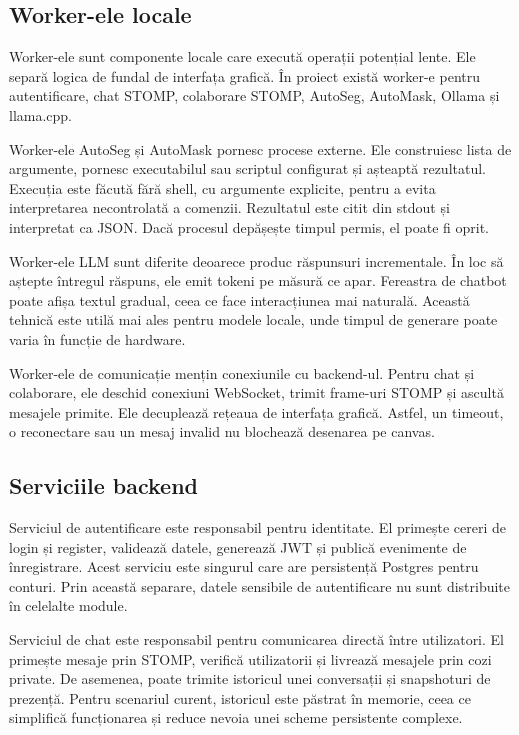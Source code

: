 \subsection{Worker-ele locale}
\label{subsec:worker-e-locale}

Worker-ele sunt componente locale care execută operații potențial lente.
Ele separă logica de fundal de interfața grafică.
În proiect există worker-e pentru autentificare, chat STOMP, colaborare STOMP, AutoSeg, AutoMask, Ollama și llama.cpp.

Worker-ele AutoSeg și AutoMask pornesc procese externe.
Ele construiesc lista de argumente, pornesc executabilul sau scriptul configurat și așteaptă rezultatul.
Execuția este făcută fără shell, cu argumente explicite, pentru a evita interpretarea necontrolată a comenzii.
Rezultatul este citit din stdout și interpretat ca JSON.
Dacă procesul depășește timpul permis, el poate fi oprit.

Worker-ele LLM sunt diferite deoarece produc răspunsuri incrementale.
În loc să aștepte întregul răspuns, ele emit tokeni pe măsură ce apar.
Fereastra de chatbot poate afișa textul gradual, ceea ce face interacțiunea mai naturală.
Această tehnică este utilă mai ales pentru modele locale, unde timpul de generare poate varia în funcție de hardware.

Worker-ele de comunicație mențin conexiunile cu backend-ul.
Pentru chat și colaborare, ele deschid conexiuni WebSocket, trimit frame-uri STOMP și ascultă mesajele primite.
Ele decuplează rețeaua de interfața grafică.
Astfel, un timeout, o reconectare sau un mesaj invalid nu blochează desenarea pe canvas.

\subsection{Serviciile backend}
\label{subsec:servicii-backend}

Serviciul de autentificare este responsabil pentru identitate.
El primește cereri de login și register, validează datele, generează JWT și publică evenimente de înregistrare.
Acest serviciu este singurul care are persistență Postgres pentru conturi.
Prin această separare, datele sensibile de autentificare nu sunt distribuite în celelalte module.

Serviciul de chat este responsabil pentru comunicarea directă între utilizatori.
El primește mesaje prin STOMP, verifică utilizatorii și livrează mesajele prin cozi private.
De asemenea, poate trimite istoricul unei conversații și snapshoturi de prezență.
Pentru scenariul curent, istoricul este păstrat în memorie, ceea ce simplifică funcționarea și reduce nevoia unei scheme persistente complexe.

